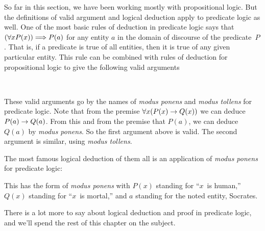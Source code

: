 So far in this section, we have been working mostly with propositional
logic.  But the definitions of valid argument and logical deduction
apply to predicate logic as well.  One of the most basic rules of
deduction in predicate logic says that $(\forall xP(x))\Longrightarrow P(a)$
for any entity $a$ in the domain of discourse of the predicate~$P$.
That is, if a predicate is true of all entities, then it is true of
any given particular entity.  This rule can be combined with 
rules of deduction for propositional logic to give the following
valid arguments
\begin{center}
\mbox{
\qquad\qquad
{}
}
\end{center}
These valid arguments go by the names of \textit{modus ponens} and
\textit{modus tollens} for predicate logic.
Note that from the premise $\forall x(P(x)\rightarrow Q(x))$ we can deduce
$P(a)\rightarrow Q(a)$.  From this and from the premise that $P(a)$, we
can deduce $Q(a)$ by \textit{modus ponens}.  So the first argument
above is valid.  The second argument is similar, using 
\textit{modus tollens}.

The most famous logical deduction of them all is an application
of \textit{modus ponens} for predicate logic:
\begin{center}
\end{center}
This has the form of \textit{modus ponens} with $P(x)$ standing
for ``$x$~is human,'' $Q(x)$ standing for ``$x$~is mortal,'' and
$a$ standing for the noted entity, Socrates.

There is a lot more to say about logical deduction and
proof in predicate logic, and we'll spend the rest of this chapter
on the subject.

